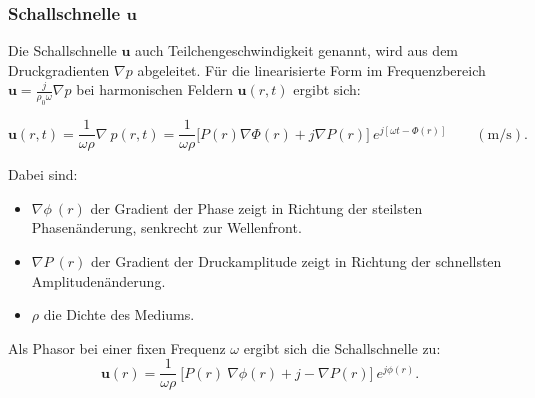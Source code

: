 \subsubsection{Schallschnelle $\mathbf{u}$}
 
Die Schallschnelle $\mathbf{u}$ auch Teilchengeschwindigkeit genannt, wird aus dem Druckgradienten $\nabla p$ abgeleitet. Für die linearisierte Form im Frequenzbereich $\mathbf{u} = \frac{j}{\rho_0 \omega} \nabla p$ bei harmonischen Feldern $\mathbf{u}(r,t)$ ergibt sich:
 
\begin{equation}
\mathbf{u}(r,t) = \frac{1}{\omega \rho} \nabla \: p(r,t) = \frac{1}{\omega \rho} \bigg[ P(r) \nabla \Phi(r) + j\nabla P(r)  \bigg] \: e^{j[\omega t -\Phi(r)]} \qquad (\si{\metre / \second}).
\end{equation}
 
\noindent Dabei sind:
\begin{itemize}
\item $\nabla \phi \: (r)$ der Gradient der Phase zeigt in Richtung der steilsten Phasenänderung, senkrecht zur Wellenfront.
\item $\nabla P \:(r)$ der Gradient der Druckamplitude zeigt in Richtung der schnellsten Amplitudenänderung.
\item $\rho$ die Dichte des Mediums.
\end{itemize}
 
\noindent Als Phasor bei einer fixen Frequenz $\omega$ ergibt sich die Schallschnelle zu:
\begin{equation}
\mathbf{u}(r) = \frac{1}{\omega \rho} \: \bigg[ P(r) \: \nabla \phi(r) + j - \nabla P(r) \bigg] \: e^{j\phi (r)}.
\label{helmholtz:PhasorSchallschnelle}
\end{equation}
 
 
 
 
